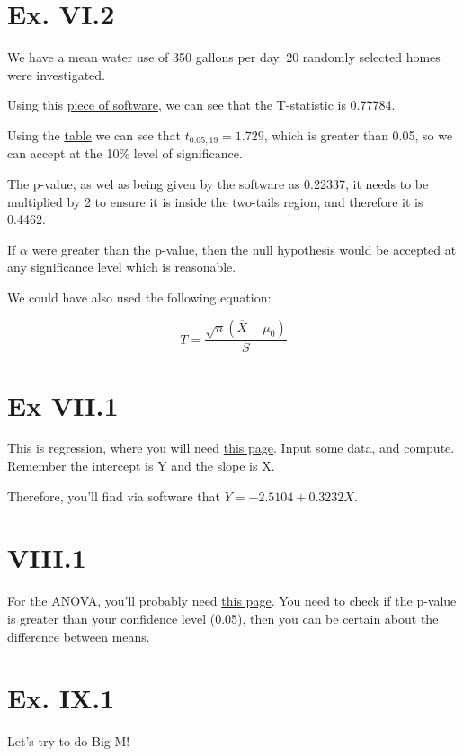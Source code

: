 \documentclass[titlepage, letterpaper]{article}
\begin{document}

\section{Ex. VI.2} %
\label{sec:ex_vi_2}

We have a mean water use of 350 gallons per day.
20 randomly selected homes were investigated.

Using this \href{https://home.ubalt.edu/ntsbarsh/Business-stat/otherapplets/MeanTest.htm}{piece of software}, we can see that the T-statistic is 0.77784.

Using the \href{http://www.sjsu.edu/faculty/gerstman/StatPrimer/t-table.pdf}{table} we can see that $t_{0.05,19} = 1.729$, which is greater than 0.05, so we can accept at the 10\% level of significance.

The p-value, as wel as being given by the software as 0.22337, it needs to be multiplied by 2 to ensure it is inside the two-tails region, and therefore it is 0.4462.

If $\alpha$ were greater than the p-value, then the null hypothesis would be accepted at any significance level which is reasonable.

We could have also used the following equation:

\begin{equation}
    T = \frac{\sqrt{n}(\overline{X} - \mu_0)}{S}
\end{equation}

\section{Ex VII.1} %
\label{sec:ex_vii_1}

This is regression, where you will need \href{https://home.ubalt.edu/ntsbarsh/Business-stat/otherapplets/Regression.htm}{this page}.
Input some data, and compute.
Remember the intercept is Y and the slope is X.

Therefore, you'll find via software that $Y = -2.5104 +0.3232X$.

\section{VIII.1} %
\label{sec:viii_1}
For the ANOVA, you'll probably need \href{https://home.ubalt.edu/ntsbarsh/Business-stat/otherapplets/ANOVA.htm}{this page}.
You need to check if the p-value is greater than your confidence level (0.05), then you can be certain about the difference between means.

\section{Ex. IX.1} %
\label{sec:ex_ix_1}

Let's try to do Big M!



\end{document}
